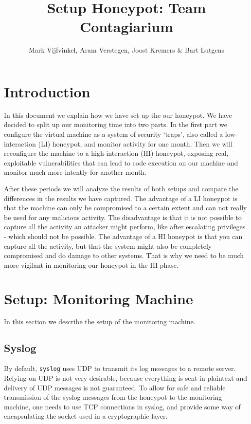 \documentclass[11pt]{article} %
\title{Setup Honeypot: Team Contagiarium}
\author{Mark Vijfvinkel, Aram Verstegen, Joost Kremers \& Bart Lutgens}
\begin{document}
\maketitle

\section{Introduction}

In this document we explain how we have set up the our honeypot. 
We have decided to split up our monitoring time into two parts.
In the first part we configure the virtual machine as a system of security `traps', also called a low-interaction (LI) honeypot, and monitor activity for one month.
Then we will reconfigure the machine to a high-interaction (HI) honeypot, exposing real, exploitable vulnerabilities that can lead to code execution on our machine and monitor much more intently for another month. 

After these periods we will analyze the results of both setups and compare the differences in the results we have captured. 
The advantage of a LI honeypot is that the machine can only be compromised to a certain extent and can not really be used for any malicious activity.
The disadvantage is that it is not possible to capture all the activity an attacker might perform, like after escalating privileges - which should not be possible.
The advantage of a HI honeypot is that you can capture all the activity, but that the system might also be completely compromised and do damage to other systems.
That is why we need to be much more vigilant in monitoring our honeypot in the HI phase.

\section{Setup: Monitoring Machine}

In this section we describe the setup of the monitoring machine.

\subsection{Syslog}
By default, \verb|syslog| uses UDP to transmit its log messages to a remote server.
Relying on UDP is not very desirable, because everything is sent in plaintext and delivery of UDP messages is not guaranteed.
To allow for safe and reliable transmission of the syslog messages from the honeypot to the monitoring machine, one needs to use TCP connections in syslog, and provide some way of encapsulating the socket used in a cryptographic layer.
\end{document}
